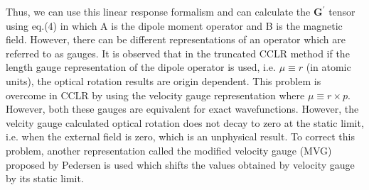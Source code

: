 Thus, we can use this linear response formalism and can calculate the $\textbf{G}^\prime$ tensor
using eq.(4) in which A is the dipole moment operator and B is the magnetic field. However, there 
can be different representations of an operator which are referred to as gauges. It is observed that 
in the truncated CCLR method if the length gauge representation of the dipole operator is used, i.e. $\mu \equiv r$ (in atomic units), the optical rotation results are origin dependent. This problem is overcome in CCLR by using the velocity
gauge representation where $\mu \equiv r\times p$. However, both these gauges are equivalent for 
exact wavefunctions. However, the velcity gauge calculated optical rotation does not decay to zero 
at the static limit, i.e. when the external field is zero, which is an unphysical result. 
To correct this problem, another representation called the modified velocity gauge (MVG)
proposed by Pedersen \cite{Pedersen04} is used which shifts the values obtained
by velocity gauge by its static limit. 

